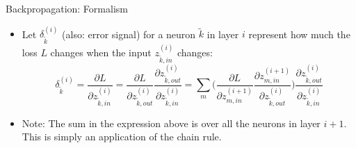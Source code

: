 \begin{vbframe} {Backpropagation: Formalism}

  \vspace*{-0.3cm}

 \begin{figure}
  \centering
  \end{figure}
  \vspace*{-0.5cm}
  \begin{small}
  \begin{itemize}
    \item Let $\delta_{\tilde{k}}^{(i)}$ (also: error signal) for a neuron $\tilde{k}$ in layer $i$ represent how much the loss $L$ changes when the input $z_{\tilde{k},in}^{(i)}$   changes:
    {\small
      $$\delta_{\tilde{k}}^{(i)} = \frac{\partial L}{\partial z_{\tilde{k},in}^{(i)}} =  \frac{\partial L}{\partial z_{\tilde{k},out}^{(i)}} \frac{\partial z_{\tilde{k},out}^{(i)}}{\partial z_{\tilde{k},in}^{(i)}}   =  \sum_m \Bigg( \frac{\partial L}{\partial z_{m,in}^{(i+1)}} \frac{\partial z_{m,in}^{(i+1)}}{\partial z_{\tilde{k},out}^{(i)}} \Bigg) \frac{\partial z_{\tilde{k},out}^{(i)}}{\partial z_{\tilde{k},in}^{(i)}} $$}

    \item Note: The sum in the expression above is over all the neurons in layer $i+1$. This is simply an application of the chain rule.
  \end{itemize}
  \end{small}
\end{vbframe}

